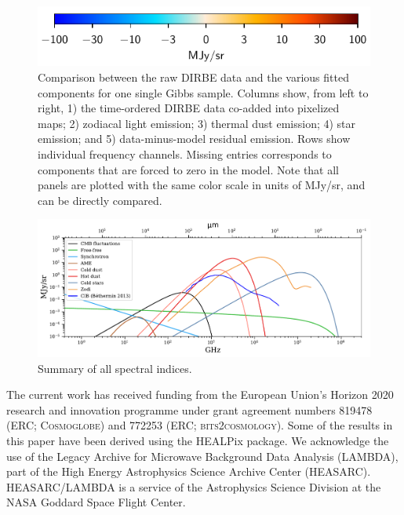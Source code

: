 \documentclass{aa}
\begin{document}
\begin{figure}
  \includegraphics[width=0.50\linewidth]{figs/colourbar_MJysr.pdf}
  \caption{Comparison between the raw DIRBE data and the various fitted components for one single Gibbs sample. Columns show, from left to right, 1) the time-ordered DIRBE data co-added into pixelized maps; 2) zodiacal light emission; 3) thermal dust emission; 4) star emission; and 5) data-minus-model residual emission. Rows show individual frequency channels. Missing entries corresponds to components that are forced to zero in the model. Note that all panels are plotted with the same color scale in units of MJy/sr, and can be directly compared.}
  \label{fig:comp_vs_freq}
\end{figure}


\begin{figure}
	\centering
	\includegraphics[width=\textwidth]{figs/all_fgs.pdf}
	\caption{Summary of all spectral indices.}
	\label{fig:SED_overview}
\end{figure}

\blindtext





\begin{acknowledgements}
 The current work has received funding from the European
  Union’s Horizon 2020 research and innovation programme under grant
  agreement numbers 819478 (ERC; \textsc{Cosmoglobe}) and 772253 (ERC;
  \textsc{bits2cosmology}). Some of the results in this paper have been derived using the HEALPix \citep{HEALPIX} package.
  We acknowledge the use of the Legacy Archive for Microwave Background Data
  Analysis (LAMBDA), part of the High Energy Astrophysics Science Archive Center
  (HEASARC). HEASARC/LAMBDA is a service of the Astrophysics Science Division at
  the NASA Goddard Space Flight Center.  
\end{acknowledgements}


%



\end{document}
